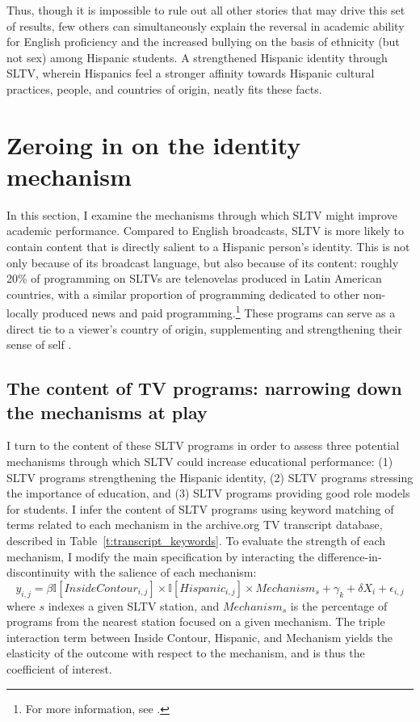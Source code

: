 \documentclass[11pt]{article}
\begin{document}
Thus, though it is impossible to rule out all other stories that may drive this set of results, few others can simultaneously explain the reversal in academic ability for English proficiency and the increased bullying on the basis of ethnicity (but not sex) among Hispanic students. A strengthened Hispanic identity through SLTV, wherein Hispanics feel a stronger affinity towards Hispanic cultural practices, people, and countries of origin, neatly fits these facts.



\section{Zeroing in on the identity mechanism}\label{s:mech}

In this section, I examine the mechanisms through which SLTV might improve academic performance. Compared to English broadcasts, SLTV is more likely to contain content that is directly salient to a Hispanic person's identity. This is not only because of its broadcast language, but also because of its content: roughly 20\% of programming on SLTVs are telenovelas produced in Latin American countries, with a similar proportion of programming dedicated to other non-locally produced news and paid programming.\footnote{ For more information, see \cite{noauthor_hispanic_2016}. } These programs can serve as a direct tie to a viewer's country of origin, supplementing and strengthening their sense of self \citep{morales2016television}. 


\subsection{The content of TV programs: narrowing down the mechanisms at play} \label{s:transcripts}

I turn to the content of these SLTV programs in order to assess three potential mechanisms through which SLTV could increase educational performance: (1) SLTV programs strengthening the Hispanic identity, (2) SLTV programs stressing the importance of education, and (3) SLTV programs providing good role models for students. I infer the content of SLTV programs using keyword matching of terms related to each mechanism in the archive.org TV transcript database, described in Table~\ref{t:transcript_keywords}. To evaluate the strength of each mechanism, I modify the main specification by interacting the difference-in-discontinuity with the salience of each mechanism:
\[ y_{i,j} =  \beta \mathbb{I}[InsideContour_{i,j}] \times \mathbb{I}[Hispanic_{i,j}] \times Mechanism_{s} + \gamma_k + \delta  X_i + \epsilon_{i,j}\] 
where $s$ indexes a given SLTV station, and $Mechanism_s$ is the percentage of programs from the nearest station focused on a given mechanism. The triple interaction term between Inside Contour, Hispanic, and Mechanism yields the elasticity of the outcome with respect to the mechanism, and is thus the coefficient of interest.
\end{document}

